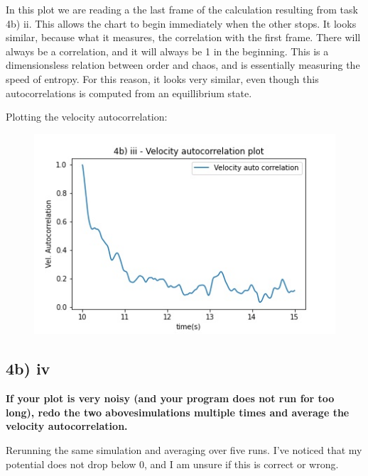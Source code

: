 \documentclass[a4paper,10pt,english]{article}
\begin{document}
In this plot we are reading a the last frame of the calculation resulting from task 4b) ii. This allows the chart to begin immediately when the other stops. It looks similar, because what it measures, the correlation with the first frame. There will always be a correlation, and it will always be 1 in the beginning. This is a dimensionsless relation between order and chaos, and is essentially measuring the speed of entropy. For this reason, it looks very similar, even though this autocorrelations is computed from an equillibrium state. 

Plotting the velocity autocorrelation:

\begin{figure}[h!]
        \centering 
        \includegraphics[scale=0.6]{./py/img/4b_iii.jpg} 
        \caption{ }
        \label{fig:4biii}
\end{figure}


\newpage
\subsection*{4b) iv}
\textbf{If your plot is very noisy (and your program does not run for too long), redo the two abovesimulations multiple times and average the velocity autocorrelation.}

Rerunning the same simulation and averaging over five runs. I've noticed that my potential does not drop below 0, and I am unsure if this is correct or wrong.
\end{document}
